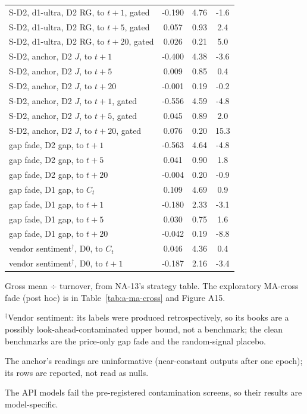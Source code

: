 \begin{longtable}{@{}lS[table-format=-1.3]S[table-format=1.2]S[table-format=-3.1]@{}}
S-D2, d1-ultra, D2 RG, to $t{+}1$, gated & -0.190 & 4.76 & -1.6 \\
S-D2, d1-ultra, D2 RG, to $t{+}5$, gated & 0.057 & 0.93 & 2.4 \\
S-D2, d1-ultra, D2 RG, to $t{+}20$, gated & 0.026 & 0.21 & 5.0 \\
S-D2, anchor, D2 $J$, to $t{+}1$ & -0.400 & 4.38 & -3.6 \\
S-D2, anchor, D2 $J$, to $t{+}5$ & 0.009 & 0.85 & 0.4 \\
S-D2, anchor, D2 $J$, to $t{+}20$ & -0.001 & 0.19 & -0.2 \\
S-D2, anchor, D2 $J$, to $t{+}1$, gated & -0.556 & 4.59 & -4.8 \\
S-D2, anchor, D2 $J$, to $t{+}5$, gated & 0.045 & 0.89 & 2.0 \\
S-D2, anchor, D2 $J$, to $t{+}20$, gated & 0.076 & 0.20 & 15.3 \\
gap fade, D2 gap, to $t{+}1$ & -0.563 & 4.64 & -4.8 \\
gap fade, D2 gap, to $t{+}5$ & 0.041 & 0.90 & 1.8 \\
gap fade, D2 gap, to $t{+}20$ & -0.004 & 0.20 & -0.9 \\
gap fade, D1 gap, to $C_t$ & 0.109 & 4.69 & 0.9 \\
gap fade, D1 gap, to $t{+}1$ & -0.180 & 2.33 & -3.1 \\
gap fade, D1 gap, to $t{+}5$ & 0.030 & 0.75 & 1.6 \\
gap fade, D1 gap, to $t{+}20$ & -0.042 & 0.19 & -8.8 \\
vendor sentiment$^{\dagger}$, D0, to $C_t$ & 0.046 & 4.36 & 0.4 \\
vendor sentiment$^{\dagger}$, D0, to $t{+}1$ & -0.187 & 2.16 & -3.4 \\
\end{longtable}
\endgroup
\vspace{-0.5\baselineskip}
{\footnotesize\raggedright
Gross mean $\div$ turnover, from NA-13's strategy table. The exploratory MA-cross fade (post hoc) is in Table~\ref{tab:a-ma-cross} and Figure A15.\par
$^{\dagger}$Vendor sentiment: its labels were produced retrospectively, so its books are a possibly look-ahead-contaminated upper bound, not a benchmark; the clean benchmarks are the price-only gap fade and the random-signal placebo.\par
The anchor's readings are uninformative (near-constant outputs after one epoch); its rows are reported, not read as nulls.\par
The API models fail the pre-registered contamination screens, so their results are model-specific.\par
}
